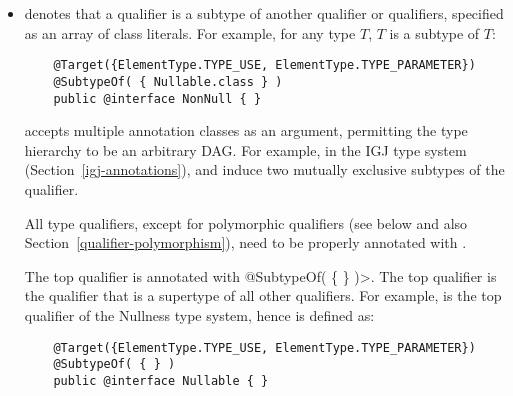 \begin{itemize}

\item {} denotes that a qualifier is a subtype of
  another qualifier or qualifiers, specified as an array of class
  literals.  For example, for any type $T$,
   $T$ is a subtype of  $T$:

  \begin{Verbatim}
    @Target({ElementType.TYPE_USE, ElementType.TYPE_PARAMETER})
    @SubtypeOf( { Nullable.class } )
    public @interface NonNull { }
  \end{Verbatim}



   accepts multiple annotation classes as an argument,
  permitting the type hierarchy to be an arbitrary DAG\@.  For example,
  in the IGJ type system (Section~\ref{igj-annotations}), 
  and  induce two mutually exclusive subtypes of the
   qualifier.


  All type qualifiers, except for polymorphic qualifiers (see below and
  also Section~\ref{qualifier-polymorphism}), need to be
  properly annotated with .

  The top qualifier is annotated with
  \<@SubtypeOf( \{ \} )>.  The top qualifier is the qualifier that is
  a supertype of all other qualifiers.  For example, 
  is the top qualifier of the Nullness type system, hence is defined as:

  \begin{Verbatim}
    @Target({ElementType.TYPE_USE, ElementType.TYPE_PARAMETER})
    @SubtypeOf( { } )
    public @interface Nullable { }
  \end{Verbatim}


\end{itemize}
